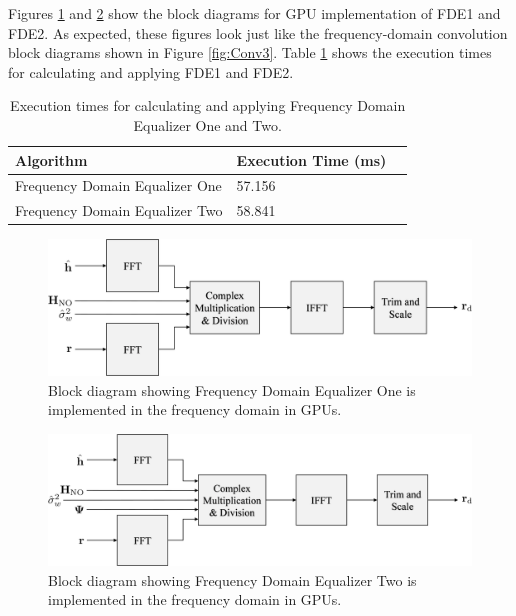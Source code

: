 Figures \ref{fig:blockFDE1} and \ref{fig:blockFDE2} show the block diagrams for GPU implementation of FDE1 and FDE2.
As expected, these figures look just like the frequency-domain convolution block diagrams shown in Figure \ref{fig:Conv3}.
Table \ref{tab:FDEtimingComparison} shows the execution times for calculating and applying FDE1 and FDE2.
\begin{table}
\caption{Execution times for calculating and applying Frequency Domain Equalizer One and Two.}
\begin{center}
\begin{tabular}{lll}
	\toprule
	Algorithm						& Execution Time (ms)	\\ \midrule
	Frequency Domain Equalizer One 	& 57.156				\\
	Frequency Domain Equalizer Two	& 58.841				\\
	\bottomrule
\end{tabular}
\end{center}
\label{tab:FDEtimingComparison}
\end{table}
\begin{figure}
	\centering\includegraphics[width=9.73in/100*55]{figures/eq_GPUimplementation/blockFDE1.pdf}
	\caption{Block diagram showing Frequency Domain Equalizer One is implemented in the frequency domain in GPUs.}
	\label{fig:blockFDE1}
\end{figure}
\begin{figure}
	\centering\includegraphics[width=10.03in/100*55]{figures/eq_GPUimplementation/blockFDE2.pdf}
	\caption{Block diagram showing Frequency Domain Equalizer Two is implemented in the frequency domain in GPUs.}
	\label{fig:blockFDE2}
\end{figure}





